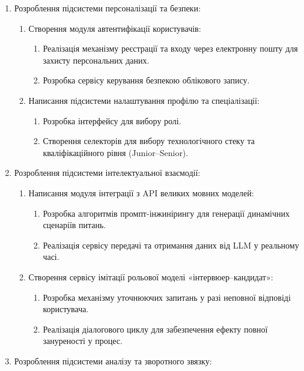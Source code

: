 \begin{enumerate}
\def\labelenumi{\arabic{enumi}.}
\item
  Розроблення підсистеми персоналізації та безпеки:

  \begin{enumerate}
  \def\labelenumii{\arabic{enumii}.}
  \item
    Створення модуля автентифікації користувачів:

    \begin{enumerate}
    \def\labelenumiii{\arabic{enumiii}.}
    \item
      Реалізація механізму реєстрації та входу через електронну пошту
      для захисту персональних даних.
    \item
      Розробка сервісу керування безпекою облікового запису.
    \end{enumerate}
  \item
    Написання підсистеми налаштування профілю та спеціалізації:

    \begin{enumerate}
    \def\labelenumiii{\arabic{enumiii}.}
    \item
      Розробка інтерфейсу для вибору ролі.
    \item
      Створення селекторів для вибору технологічного стеку та
      кваліфікаційного рівня (Junior--Senior).
    \end{enumerate}
  \end{enumerate}
\item
  Розроблення підсистеми інтелектуальної взаємодії:

  \begin{enumerate}
  \def\labelenumii{\arabic{enumii}.}
  \item
    Написання модуля інтеграції з API великих мовних моделей:

    \begin{enumerate}
    \def\labelenumiii{\arabic{enumiii}.}
    \item
      Розробка алгоритмів промпт-інжинірингу для генерації динамічних
      сценаріїв питань.
    \item
      Реалізація сервісу передачі та отримання даних від LLM у реальному
      часі.
    \end{enumerate}
  \item
    Створення сервісу імітації рольової моделі
    «інтерв\textquotesingle юер--кандидат»:

    \begin{enumerate}
    \def\labelenumiii{\arabic{enumiii}.}
    \item
      Розробка механізму уточнюючих запитань у разі неповної відповіді
      користувача.
    \item
      Реалізація діалогового циклу для забезпечення ефекту повної
      зануреності у процес.
    \end{enumerate}
  \end{enumerate}
\item
  Розроблення підсистеми аналізу та зворотного зв\textquotesingle язку:


\end{enumerate}
